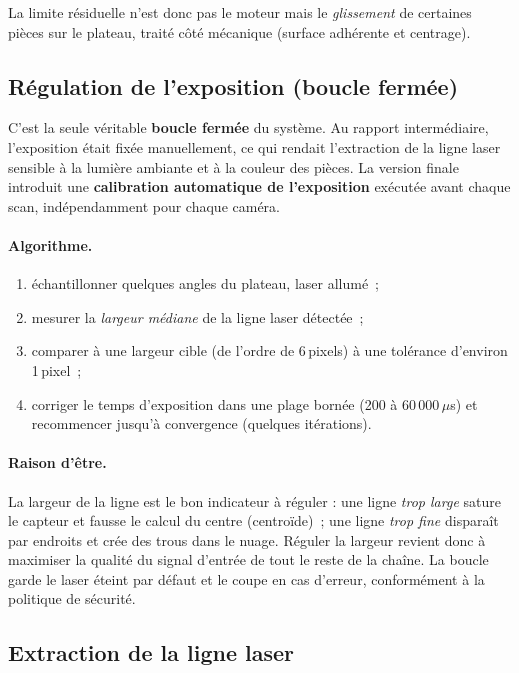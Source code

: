 La limite résiduelle n'est donc pas le moteur mais le \emph{glissement} de
certaines pièces sur le plateau, traité côté mécanique (surface adhérente et
centrage).

\subsection{Régulation de l'exposition (boucle fermée)}

C'est la seule véritable \textbf{boucle fermée} du système. Au rapport
intermédiaire, l'exposition était fixée manuellement, ce qui rendait
l'extraction de la ligne laser sensible à la lumière ambiante et à la couleur
des pièces. La version finale introduit une \textbf{calibration automatique de
l'exposition} exécutée avant chaque scan, indépendamment pour chaque caméra.

\paragraph{Algorithme.}
\begin{enumerate}
  \item échantillonner quelques angles du plateau, laser allumé~;
  \item mesurer la \emph{largeur médiane} de la ligne laser détectée~;
  \item comparer à une largeur cible (de l'ordre de 6\,pixels) à une tolérance
        d'environ 1\,pixel~;
  \item corriger le temps d'exposition dans une plage bornée
        (200 à 60\,000\,$\mu$s) et recommencer jusqu'à convergence (quelques
        itérations).
\end{enumerate}

\paragraph{Raison d'être.}
La largeur de la ligne est le bon indicateur à réguler : une ligne \emph{trop
large} sature le capteur et fausse le calcul du centre (centroïde)~; une ligne
\emph{trop fine} disparaît par endroits et crée des trous dans le nuage.
Réguler la largeur revient donc à maximiser la qualité du signal d'entrée de
tout le reste de la chaîne. La boucle garde le laser éteint par défaut et le
coupe en cas d'erreur, conformément à la politique de sécurité.

\subsection{Extraction de la ligne laser}

